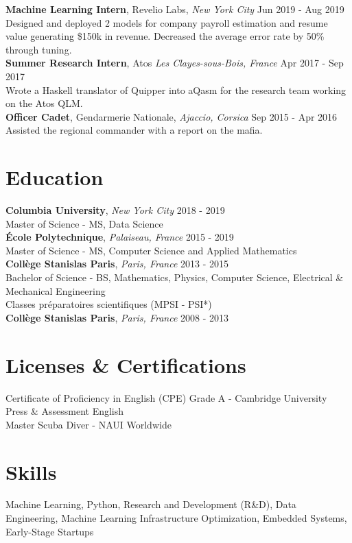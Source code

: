 \documentclass[a4paper,10pt]{article}
\begin{document}
    \noindent\textbf{Machine Learning Intern}, Revelio Labs, \textit{New York City} \hfill Jun 2019 - Aug 2019\\
    Designed and deployed 2 models for company payroll estimation and resume value generating \$150k in revenue. Decreased the average error rate by 50\% through tuning.\\

    \noindent\textbf{Summer Research Intern}, Atos \textit{Les Clayes-sous-Bois, France} \hfill Apr 2017 - Sep 2017\\
    Wrote a Haskell translator of Quipper into aQasm for the research team working on the Atos QLM.\\

    \noindent\textbf{Officer Cadet}, Gendarmerie Nationale, \textit{Ajaccio, Corsica} \hfill Sep 2015 - Apr 2016\\
    Assisted the regional commander with a report on the mafia.

    \section*{Education}

    \noindent\textbf{Columbia University}, \textit{New York City} \hfill 2018 - 2019\\
    Master of Science - MS, Data Science\\

    \noindent\textbf{École Polytechnique}, \textit{Palaiseau, France} \hfill 2015 - 2019\\
    Master of Science - MS, Computer Science and Applied Mathematics\\

    \noindent\textbf{Collège Stanislas Paris}, \textit{Paris, France} \hfill 2013 - 2015\\
    Bachelor of Science - BS, Mathematics, Physics, Computer Science, Electrical \& Mechanical Engineering\\
    Classes préparatoires scientifiques (MPSI - PSI*)\\

    \noindent\textbf{Collège Stanislas Paris}, \textit{Paris, France} \hfill 2008 - 2013\\

    \section*{Licenses \& Certifications}
    Certificate of Proficiency in English (CPE) Grade A - Cambridge University Press \& Assessment English \hfill \\
    Master Scuba Diver - NAUI Worldwide \hfill

    \section*{Skills}
    Machine Learning, Python, Research and Development (R\&D), Data Engineering, Machine Learning Infrastructure Optimization, Embedded Systems, Early-Stage Startups
\end{document}

